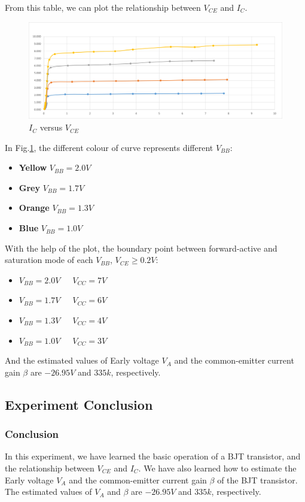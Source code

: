     From this table, we can plot the relationship between $V_{CE}$ and $I_C$.\par
    \begin{figure}[H]
        \centering
        \includegraphics[width=0.9\linewidth]{Experiment_04/DataPlots.png}
        \caption{$I_C$ versus $V_{CE}$}
        \label{L4Plots}
    \end{figure}
    In Fig.\ref{L4Plots}, the different colour of curve represents different $V_{BB}$:
    \begin{itemize}
        \item \textbf{Yellow} $V_{BB} = 2.0V$
        \item \textbf{Grey} $V_{BB} = 1.7V$
        \item \textbf{Orange} $V_{BB} = 1.3V$
        \item \textbf{Blue} $V_{BB} = 1.0V$
    \end{itemize}
    With the help of the plot, the boundary point between forward-active and saturation mode of each $V_{BB}$, $V_{CE} \ge 0.2V$:\par
    \begin{itemize}
        \item $V_{BB} = 2.0V$~~~$V_{CC} = 7V$
        \item $V_{BB} = 1.7V$~~~$V_{CC} = 6V$
        \item $V_{BB} = 1.3V$~~~$V_{CC} = 4V$
        \item $V_{BB} = 1.0V$~~~$V_{CC} = 3V$
    \end{itemize}
    And the estimated values of Early voltage $V_A$ and the common-emitter current gain $\beta$ are $-26.95V$ and $335k$, respectively.
    
\subsection{Experiment Conclusion}
    \subsubsection{Conclusion}
    In this experiment, we have learned the basic operation of a BJT transistor, and the relationship between $V_{CE}$ and $I_C$. We have also learned how to estimate the Early voltage $V_A$ and the common-emitter current gain $\beta$ of the BJT transistor. The estimated values of $V_A$ and $\beta$ are $-26.95V$ and $335k$, respectively.